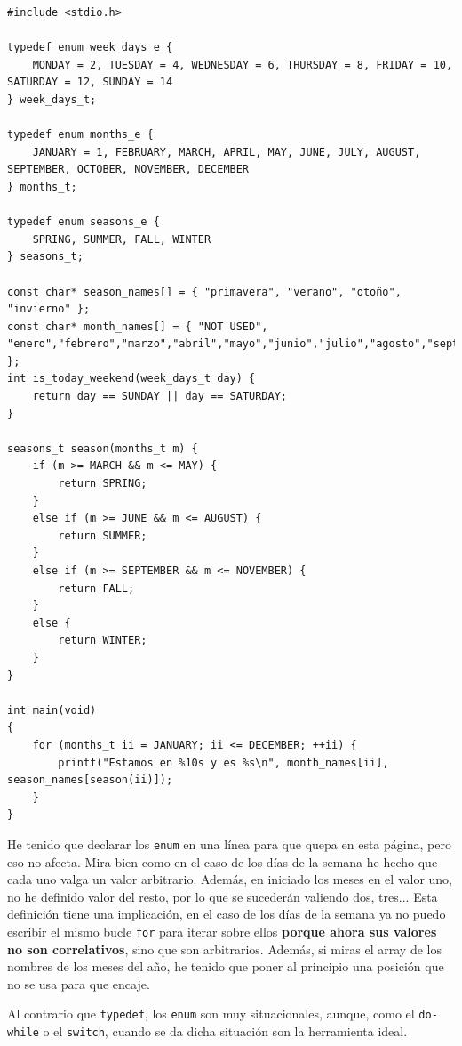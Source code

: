 \documentclass[a4paper]{article}
\begin{document}
\noindent
\begin{minipage}[H]{\linewidth}
\mbox{}
\begin{lstlisting}[style=C,
caption={Ejemplo final de enumerados},
label={lst:finalEnums}]
#include <stdio.h>

typedef enum week_days_e {
    MONDAY = 2, TUESDAY = 4, WEDNESDAY = 6, THURSDAY = 8, FRIDAY = 10, SATURDAY = 12, SUNDAY = 14
} week_days_t;

typedef enum months_e {
    JANUARY = 1, FEBRUARY, MARCH, APRIL, MAY, JUNE, JULY, AUGUST, SEPTEMBER, OCTOBER, NOVEMBER, DECEMBER
} months_t;

typedef enum seasons_e {
    SPRING, SUMMER, FALL, WINTER
} seasons_t;

const char* season_names[] = { "primavera", "verano", "otoño", "invierno" };
const char* month_names[] = { "NOT USED", "enero","febrero","marzo","abril","mayo","junio","julio","agosto","septiembre","octubre","noviembre","diciembre" };
int is_today_weekend(week_days_t day) {
    return day == SUNDAY || day == SATURDAY;
}

seasons_t season(months_t m) {
    if (m >= MARCH && m <= MAY) {
        return SPRING;
    }
    else if (m >= JUNE && m <= AUGUST) {
        return SUMMER;
    }
    else if (m >= SEPTEMBER && m <= NOVEMBER) {
        return FALL;
    }
    else {
        return WINTER;
    }
}

int main(void)
{
    for (months_t ii = JANUARY; ii <= DECEMBER; ++ii) {
        printf("Estamos en %10s y es %s\n", month_names[ii], season_names[season(ii)]);
    }
}
\end{lstlisting}
\end{minipage}

He tenido que declarar los \verb!enum! en una línea para que quepa en esta
página, pero eso no afecta. Mira bien como en el caso de los días de la semana
he hecho que cada uno valga un valor arbitrario. Además, en iniciado los meses
en el valor uno, no he definido valor del resto, por lo que se sucederán
valiendo dos, tres... Esta definición tiene una implicación, en el
caso de los días de la semana ya no puedo escribir el mismo
bucle \verb!for! para iterar sobre
ellos \textbf{porque ahora sus valores no son correlativos},
sino que son arbitrarios. Además, si miras el array de
los nombres de los meses del año, he tenido que poner al principio una
posición que no se usa para que encaje.

Al contrario que \verb!typedef!, los \verb!enum! son muy situacionales, aunque,
como el \verb!do-while! o el \verb!switch!, cuando se da dicha situación son
la herramienta ideal.
\end{document}
